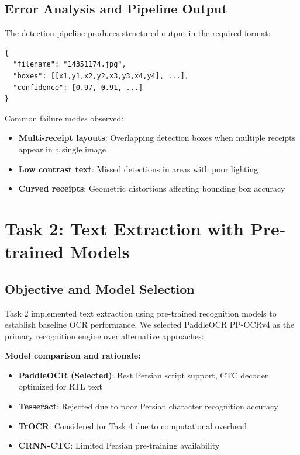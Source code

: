 \documentclass[11pt,a4paper]{article}
\begin{document}
\subsection{Error Analysis and Pipeline Output}
The detection pipeline produces structured output in the required format:
\begin{verbatim}
{
  "filename": "14351174.jpg",
  "boxes": [[x1,y1,x2,y2,x3,y3,x4,y4], ...],
  "confidence": [0.97, 0.91, ...]
}
\end{verbatim}

Common failure modes observed:
\begin{itemize}
  \item \textbf{Multi-receipt layouts}: Overlapping detection boxes when multiple receipts appear in a single image
  \item \textbf{Low contrast text}: Missed detections in areas with poor lighting
  \item \textbf{Curved receipts}: Geometric distortions affecting bounding box accuracy
\end{itemize}

\section{Task 2: Text Extraction with Pre-trained Models}

\subsection{Objective and Model Selection}
Task 2 implemented text extraction using pre-trained recognition models to establish baseline OCR performance. We selected PaddleOCR PP-OCRv4 as the primary recognition engine over alternative approaches:

\textbf{Model comparison and rationale:}
\begin{itemize}
  \item \textbf{PaddleOCR (Selected)}: Best Persian script support, CTC decoder optimized for RTL text
  \item \textbf{Tesseract}: Rejected due to poor Persian character recognition accuracy
  \item \textbf{TrOCR}: Considered for Task 4 due to computational overhead
  \item \textbf{CRNN-CTC}: Limited Persian pre-training availability
\end{itemize}
\end{document}
